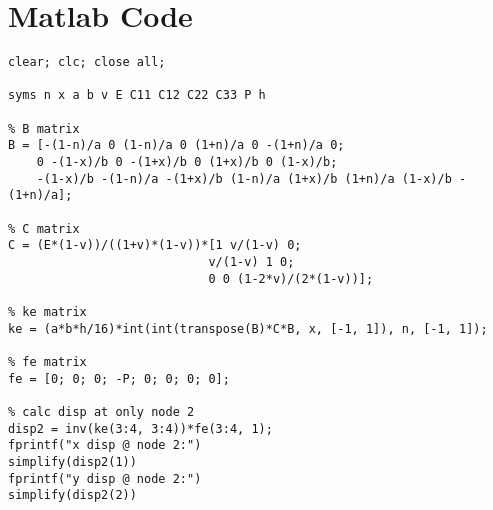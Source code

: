 \documentclass{article}
\begin{document}
\section*{Matlab Code}
\begin{verbatim}
clear; clc; close all;

syms n x a b v E C11 C12 C22 C33 P h

% B matrix
B = [-(1-n)/a 0 (1-n)/a 0 (1+n)/a 0 -(1+n)/a 0;
    0 -(1-x)/b 0 -(1+x)/b 0 (1+x)/b 0 (1-x)/b;
    -(1-x)/b -(1-n)/a -(1+x)/b (1-n)/a (1+x)/b (1+n)/a (1-x)/b -(1+n)/a];

% C matrix
C = (E*(1-v))/((1+v)*(1-v))*[1 v/(1-v) 0;
                            v/(1-v) 1 0;
                            0 0 (1-2*v)/(2*(1-v))];

% ke matrix
ke = (a*b*h/16)*int(int(transpose(B)*C*B, x, [-1, 1]), n, [-1, 1]);

% fe matrix
fe = [0; 0; 0; -P; 0; 0; 0; 0];

% calc disp at only node 2
disp2 = inv(ke(3:4, 3:4))*fe(3:4, 1);
fprintf("x disp @ node 2:")
simplify(disp2(1))
fprintf("y disp @ node 2:")
simplify(disp2(2))
\end{verbatim}
\end{document}
